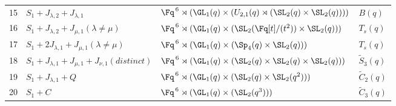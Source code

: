 \begin{longtable}{@{}c p{} p{} p{}@{}}
15 & $S_1 + J_{\lambda,2} + J_{\lambda,1}$ & $\Fq^{\,6}\rtimes (\GL_1(q)\times (U_{2,1}(q)\rtimes (\SL_2(q)\times \SL_2(q))))$ & $B(q)$ \\
16 & $S_1 + J_{\lambda,2} + J_{\mu,1} (\lambda \neq \mu)$ & $\Fq^{\,6}\rtimes (\GL_1(q)\times (\SL_2(\Fq[t]/(t^2))\times \SL_2(q)))$ & $T_s(q)$ \\
17 & $S_1 + 2J_{\lambda,1} + J_{\mu,1} (\lambda \neq \mu)$ & $\Fq^{\,6}\rtimes (\GL_1(q)\times (\Sp_4(q)\times \SL_2(q)))$ & $T_s(q)$ \\
18 & $S_1 + J_{\lambda,1} + J_{\mu,1} + J_{\nu,1} (distinct)$ & $\Fq^{\,6}\rtimes (\GL_1(q)\times (\SL_2(q)\times \SL_2(q)\times \SL_2(q)))$ & $\widetilde{S}_3(q)$ \\
19 & $S_1 + J_{\lambda,1} + Q$ & $\Fq^{\,6}\rtimes (\GL_1(q)\times (\SL_2(q)\times \SL_2(q^2)))$ & $\widetilde{C}_2(q)$ \\
20 & $S_1 + C$ & $\Fq^{\,6}\rtimes (\GL_1(q)\times (\SL_2(q^3)))$ & $\widetilde{C}_3(q)$ \\
\end{longtable}
